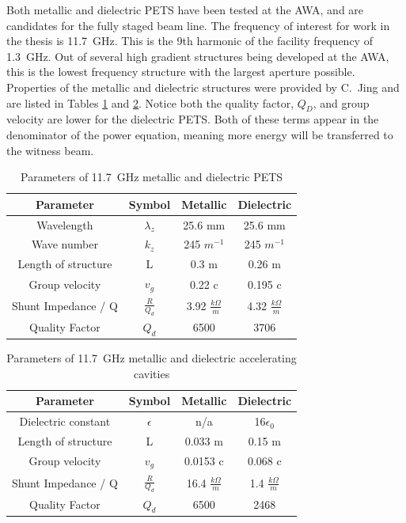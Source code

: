 Both metallic and dielectric PETS have been tested at the AWA, 
and are candidates for the fully staged beam line. 
The frequency of interest for work in the thesis is \SI{11.7}{GHz}. 
This is the 9th harmonic of the facility frequency of \SI{1.3}{GHz}.
Out of several high gradient structures being developed at the AWA, 
this is the lowest frequency structure with the largest aperture possible. 
Properties of the metallic and dielectric structures were provided by C.~Jing and are listed in 
Tables \ref{table:PETS} and \ref{table:acc}. 
Notice both the quality factor, $Q_D$, and group velocity are lower for the dielectric PETS. 
Both of these terms appear in the denominator of the power equation, meaning more
energy will be transferred to the witness beam.
\begin{table}
	\begin{center}
	\caption{Parameters of \SI{11.7}{GHz} metallic and dielectric PETS}
	\label{table:PETS}
	
			\begin{tabular}{cccc}  
			\toprule
			\toprule
			\textbf{Parameter} & \textbf{Symbol} & \textbf{Metallic }& \textbf{Dielectric} \\
			\midrule
			Wavelength 	& $\lambda_{z}$ & 25.6 mm 	&  25.6 mm	\\  
			Wave number & $k_{z}$ 		& 245 $m^{-1}$ 	& 245 $m^{-1}$\\  
			Length of structure & L & 0.3 m & 0.26 m\\  
			Group velocity & $v_{g}$ & 0.22 c & 0.195 c\\  
			Shunt Impedance / Q & $\frac{R}{Q_{d}}$ & 3.92 $\frac{k\Omega}{m}$  & 4.32 $\frac{k\Omega}{m}$\\  
			Quality Factor & $Q_{d}$ & 6500 &3706\\  
			\bottomrule		
		\end{tabular}
\end{center}
\end{table}
\begin{table}
	\begin{center}
		\caption{Parameters of \SI{11.7}{GHz} metallic and dielectric accelerating cavities}
		\label{table:acc}
		
		\begin{tabular}{cccc}  
			\toprule
			\toprule
			\textbf{Parameter} & \textbf{Symbol} & \textbf{Metallic }& \textbf{Dielectric} \\
			\midrule
			Dielectric constant & $\epsilon$ & n/a & 16\;$\epsilon_0$ \\
			Length of structure & L & 0.033 m & 0.15 m\\  
			Group velocity & $v_{g}$ & 0.0153 c & 0.068 c\\  
			Shunt Impedance / Q & $\frac{R}{Q_{d}}$ & 16.4 $\frac{k\Omega}{m}$  & 1.4 $\frac{k\Omega}{m}$\\  
			Quality Factor & $Q_{d}$ & 6500  &2468\\  
			\bottomrule		
		\end{tabular}
	\end{center}
\end{table}

